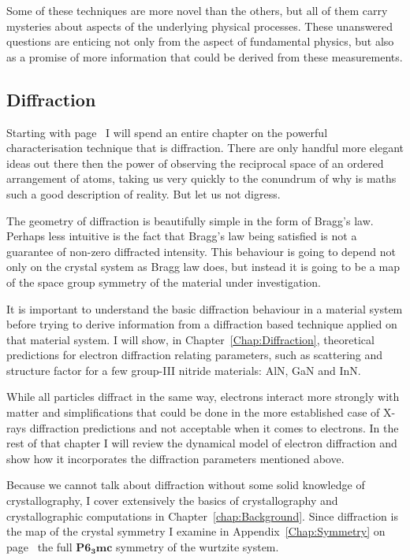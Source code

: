 Some of these techniques are more novel than the others, but all of them carry mysteries about aspects of the underlying physical processes. These unanswered questions are enticing not only from the aspect of fundamental physics, but also as a promise of more information that could be derived from these measurements.





\subsection{Diffraction}

Starting with page~\pageref{Chap:Diffraction} I will spend an entire chapter on the powerful characterisation technique that is diffraction. There are only handful more elegant ideas out there then the power of observing the reciprocal space of an ordered arrangement of atoms, taking us very quickly to the conundrum of why is maths such a good description of reality.  But let us not digress. 

The geometry of diffraction is beautifully simple in the form of Bragg's law. Perhaps less intuitive is the fact that Bragg's law being satisfied is not a guarantee of non-zero diffracted intensity. This behaviour is going to depend not only on the crystal system as Bragg law does, but instead it is going to be a map of the space group symmetry of the material under investigation. 

It is important to understand the basic diffraction behaviour in a material system before trying to derive information from a diffraction based technique applied on that material system. I will show, in Chapter~\ref{Chap:Diffraction}, theoretical predictions for electron diffraction relating parameters, such as scattering and structure factor for a few group-III nitride materials: AlN, GaN and InN. 

While all particles diffract in the same way, electrons interact more strongly with matter and simplifications that could be done in the more established case of X-rays diffraction predictions and not acceptable when it comes to electrons. In the rest of that chapter I will review the dynamical model of electron diffraction and show how it incorporates the diffraction parameters mentioned above.

Because we cannot talk about diffraction without some solid knowledge of crystallography, I cover extensively the basics of crystallography and crystallographic computations in Chapter~\ref{chap:Background}. Since diffraction is the map of the crystal symmetry I examine in Appendix~\ref{Chap:Symmetry} on page~\pageref{Chap:Symmetry} the full $\mathbf{P6_3mc}$ symmetry of the wurtzite system.  

